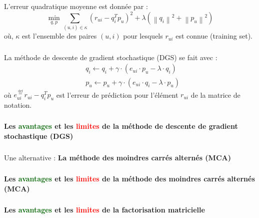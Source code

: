 \begin{frame}
	 \frametitle{\PartII}
	L'erreur quadratique moyenne est donnée par :
	\begin{equation*}
	\min _{q, p} \sum_{(u, i) \in \kappa}\left(r_{u i}-q_i^T p_u\right)^2+\lambda\left(\left\|q_i\right\|^2+\left\|p_u\right\|^2\right)
 	\end{equation*}
 	où, $\kappa$ est l'ensemble des paires $(u,i)$ pour lesquels $r_{ui}$ est connue (training set).
	
\end{frame}

\begin{frame}
	 \frametitle{\PartII}
	La méthode de descente de gradient stochastique (DGS) se fait avec :
	\begin{equation*}
		\begin{aligned}
			& q_i \leftarrow q_i+\gamma \cdot\left(e_{u i} \cdot p_u-\lambda \cdot q_i\right) \\
			& p_u \leftarrow p_u+\gamma \cdot\left(e_{u i} \cdot q_i-\lambda \cdot p_u\right)
		\end{aligned}
	\end{equation*}
	où $e_{u i}^{\stackrel{\text { def }}{=}} r_{u i}-q_i^T p_u$ est l'erreur de prédiction pour l'élément $r_{ui}$ de la matrice de notation.
\end{frame}

\begin{frame}
	 \frametitle{\PartII}
	\framesubtitle{}
	\begin{center}
		\textbf{\large{Les \textcolor{darkgreen}{avantages} et les \textcolor{red}{limites} de la méthode de descente de gradient stochastique (DGS)}}
	\end{center}
\end{frame}

\begin{frame}
	 \frametitle{\PartII}
	\begin{center}
		\large{Une alternative : \textbf{La méthode des moindres carrés alternés (MCA)}}
	\end{center}
\end{frame}

\begin{frame}
	 \frametitle{\PartII}
	\begin{center}
		\textbf{\large{Les \textcolor{darkgreen}{avantages} et les \textcolor{red}{limites} de la méthode des moindres carrés alternés (MCA)}}
	\end{center}
\end{frame}

\begin{frame}
	 \frametitle{\PartII}
	\begin{center}
		\textbf{\large{Les \textcolor{darkgreen}{avantages} et les \textcolor{red}{limites} de la factorisation matricielle}}
	\end{center}
\end{frame}